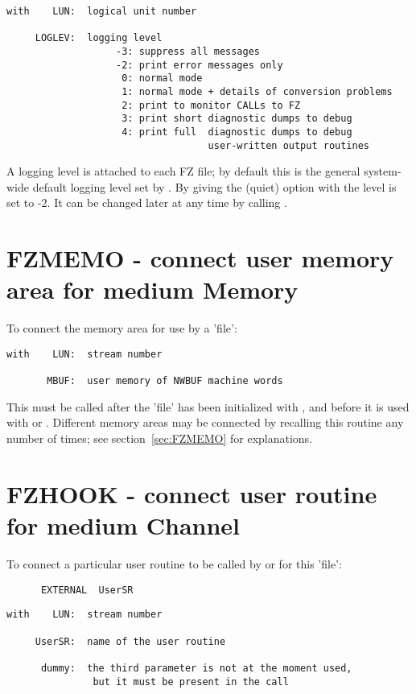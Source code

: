 \begin{verbatim}
with    LUN:  logical unit number

     LOGLEV:  logging level
                   -3: suppress all messages
                   -2: print error messages only
                    0: normal mode
                    1: normal mode + details of conversion problems
                    2: print to monitor CALLs to FZ
                    3: print short diagnostic dumps to debug
                    4: print full  diagnostic dumps to debug
                                   user-written output routines
\end{verbatim}
A logging level is attached to each FZ file;
by default this is the general system-wide default logging level
set by .
By giving the  (quiet) option with  the level is set to -2.
It can be changed later at any time by calling .

\section{FZMEMO - connect user memory area for medium Memory}

To connect the memory area for use by a 'file':

\begin{verbatim}
with    LUN:  stream number

       MBUF:  user memory of NWBUF machine words
\end{verbatim}
This must be called after the 'file' has been initialized
with , and before it is used with  or .
Different memory areas may be connected by recalling this
routine any number of times;
see section~\ref{sec:FZMEMO} for explanations.

\section{FZHOOK - connect user routine for medium Channel}

To connect a particular user routine to be called
by  or  for this 'file':
\begin{verbatim}
      EXTERNAL  UserSR
\end{verbatim}


\begin{verbatim}
with    LUN:  stream number

     UserSR:  name of the user routine

      dummy:  the third parameter is not at the moment used,
               but it must be present in the call
\end{verbatim}

